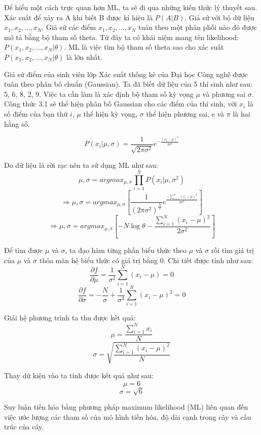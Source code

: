 \documentclass[12pt]{report}
\begin{document}
Để hiểu một cách trực quan hơn ML, ta sẽ đi qua những kiến thức lý thuyết sau. Xác suất để xảy ra A khi biết B được kí hiệu là $P(A|B)$. Giả sử với bộ dữ liệu $ x_1, x_2, …, x_N $. Giả sử các điểm  $ x_1, x_2, …, x_N $ tuân theo một phân phối nào đó được mô tả bằng bộ tham số theta. Từ đây ta có khái niệm mang tên likelihood:  $ P(x_1, x_2, …, x_N | \theta) $. ML là việc tìm bộ tham số theta sao cho xác suất $ P(x_1, x_2, …, x_N | \theta) $ là lớn nhất. 

Giả sử điểm của sinh viên lớp Xác suất thống kê của Đại học Công nghệ được tuân theo phân bố chuẩn (Gaussian). Ta đã biết dữ liệu của 5 thí sinh như sau: 5, 6, 8, 2, 9. Việc ta cần làm là xác định bộ tham số kỳ vọng $ \mu $ và phương sai $ \sigma $. Công thức 3.1 sẽ thể hiện phân bố Gaussian cho các điểm của thí sinh, với  $x_i$ là số điểm của bạn thứ $i$, $\mu$ thể hiện kỳ vọng, $\sigma$ thể hiện phương sai, e và $\pi$ là hai hằng số.

\begin{equation}
    P(x_i | \mu,\sigma) = \frac{1}{\sqrt{2\pi\sigma^2}} e ^ {-\frac{(x_i - \mu)^2}{2 \sigma^2}}
\end{equation}

Do dữ liệu là rời rạc nên ta sử dụng ML như sau:
$$ \mu , \sigma = argmax_{\mu, \sigma} \prod_{i=1} ^ {N} P(x_i | \mu, \sigma^2) $$
$$ \Rightarrow \mu , \sigma = argmax_{\mu, \sigma} [ \frac{1}{({2\pi\sigma^2})^\frac{N}{2}} e^{\frac{-\sum_{i=1}^{N}{(x_i - \mu)}^2}{2\sigma^2}}] $$
$$ \Rightarrow \mu , \sigma = argmax_{\mu, \sigma} [-N \log{\theta} - \frac{\sum_{i=1}^{N} {(x_i - \mu)} ^ 2}{2\sigma^2}] $$

Để tìm được $\mu$ và $\sigma$, ta đạo hàm từng phần biểu thức theo $\mu$ và $\sigma$ rồi tìm giá trị của $\mu$ và $\sigma$ thỏa mãn hệ biểu thức có giá trị bằng 0. Chi tiết được tính như sau:
$$ \frac{\partial f}{\partial \mu} = \frac{1}{\sigma^2} \sum_{i=1}^{N} (x_i - \mu) = 0$$
$$ \frac{\partial f}{\partial \sigma} = -\frac{N}{\sigma} + \frac{1}{\sigma^3} \sum_{i=1}^{N} (x_i - \mu)^2 = 0$$

Giải hệ phương trình ta thu được kết quả:
$$ \mu = \frac{\sum_{i=1}^{N} x_i}{N}$$
$$ \sigma = \sqrt{\frac{\sum_{i=1}^{N} (x_i - \mu)^2}{N}}$$

Thay dữ kiện vào ta tính được kết quả như sau:
$$ \mu = 6 $$
$$ \sigma = \sqrt{6} $$

Suy luận tiến hóa bằng phương pháp maximum likelihood (ML) liên quan đến việc ước lượng các tham số của mô hình tiến hóa, độ dài cạnh trong cây và cấu trúc của cây. 
\end{document}
